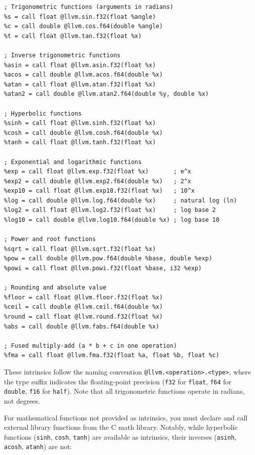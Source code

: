 \begin{lstlisting}[style=ir]
; Trigonometric functions (arguments in radians)
%s = call float @llvm.sin.f32(float %angle)
%c = call double @llvm.cos.f64(double %angle)
%t = call float @llvm.tan.f32(float %x)

; Inverse trigonometric functions
%asin = call float @llvm.asin.f32(float %x)
%acos = call double @llvm.acos.f64(double %x)
%atan = call float @llvm.atan.f32(float %x)
%atan2 = call double @llvm.atan2.f64(double %y, double %x)

; Hyperbolic functions
%sinh = call float @llvm.sinh.f32(float %x)
%cosh = call double @llvm.cosh.f64(double %x)
%tanh = call float @llvm.tanh.f32(float %x)

; Exponential and logarithmic functions
%exp = call float @llvm.exp.f32(float %x)       ; e^x
%exp2 = call double @llvm.exp2.f64(double %x)   ; 2^x
%exp10 = call float @llvm.exp10.f32(float %x)   ; 10^x
%log = call double @llvm.log.f64(double %x)     ; natural log (ln)
%log2 = call float @llvm.log2.f32(float %x)     ; log base 2
%log10 = call double @llvm.log10.f64(double %x) ; log base 10

; Power and root functions
%sqrt = call float @llvm.sqrt.f32(float %x)
%pow = call double @llvm.pow.f64(double %base, double %exp)
%powi = call float @llvm.powi.f32(float %base, i32 %exp)

; Rounding and absolute value
%floor = call float @llvm.floor.f32(float %x)
%ceil = call double @llvm.ceil.f64(double %x)
%round = call float @llvm.round.f32(float %x)
%abs = call double @llvm.fabs.f64(double %x)

; Fused multiply-add (a * b + c in one operation)
%fma = call float @llvm.fma.f32(float %a, float %b, float %c)
\end{lstlisting}

These intrinsics follow the naming convention \texttt{@llvm.<operation>.<type>}, where the type suffix indicates the floating-point precision (\texttt{f32} for \texttt{float}, \texttt{f64} for \texttt{double}, \texttt{f16} for \texttt{half}). Note that all trigonometric functions operate in radians, not degrees.

For mathematical functions not provided as  intrinsics, you must declare and call external library functions from the C math library. Notably, while hyperbolic functions (\texttt{sinh}, \texttt{cosh}, \texttt{tanh}) are available as intrinsics, their inverses (\texttt{asinh}, \texttt{acosh}, \texttt{atanh}) are not:

